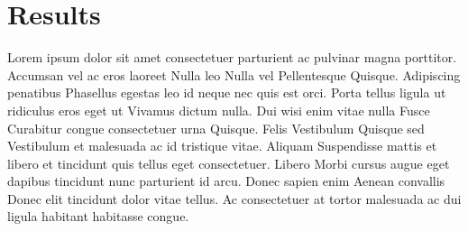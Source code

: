 \chapter{Results} \label{chap:results}
Lorem ipsum dolor sit amet consectetuer parturient ac pulvinar magna porttitor. Accumsan vel ac eros laoreet Nulla leo Nulla vel Pellentesque Quisque. Adipiscing penatibus Phasellus egestas leo id neque nec quis est orci. Porta tellus ligula ut ridiculus eros eget ut Vivamus dictum nulla. Dui wisi enim vitae nulla Fusce Curabitur congue consectetuer urna Quisque. Felis Vestibulum Quisque sed Vestibulum et malesuada ac id tristique vitae. Aliquam Suspendisse mattis et libero et tincidunt quis tellus eget consectetuer. Libero Morbi cursus augue eget dapibus tincidunt nunc parturient id arcu. Donec sapien enim Aenean convallis Donec elit tincidunt dolor vitae tellus. Ac consectetuer at tortor malesuada ac dui ligula habitant habitasse congue. 


\begin{figure}[h!]
    \label{fig:results-basic}
    
\end{figure}

\begin{figure}[h!]
    \label{fig:results-chars}
    
\end{figure}

\begin{figure}[h!]
    \label{fig:results-complex}
    
\end{figure}

\begin{figure}[h!]
    \label{fig:results-sec}
    
\end{figure}

